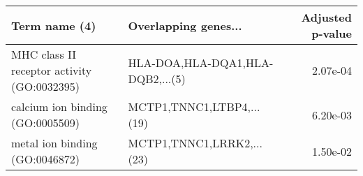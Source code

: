 \begin{tabular}{llr}
\toprule
                              Term name (4) &             Overlapping genes... &  Adjusted p-value \\
\midrule
MHC class II receptor activity (GO:0032395) & HLA-DOA,HLA-DQA1,HLA-DQB2,...(5) &          2.07e-04 \\
           calcium ion binding (GO:0005509) &        MCTP1,TNNC1,LTBP4,...(19) &          6.20e-03 \\
             metal ion binding (GO:0046872) &        MCTP1,TNNC1,LRRK2,...(23) &          1.50e-02 \\
\bottomrule
\end{tabular}
